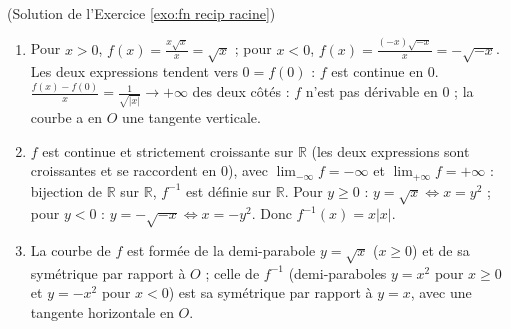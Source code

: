 \begin{corrige}
\begin{sol} ~ \\
(Solution de l'Exercice \ref{exo:fn recip racine})
\begin{enumerate}
\item Pour $x > 0$, $f(x) = \frac{x\sqrt{x}}{x} = \sqrt{x}$ ; pour $x < 0$, $f(x) = \frac{(-x)\sqrt{-x}}{x} = -\sqrt{-x}$.
      Les deux expressions tendent vers $0 = f(0)$ : $f$ est continue en $0$.
      $\frac{f(x) - f(0)}{x} = \frac{1}{\sqrt{|x|}} \to +\infty$ des deux c\^ot\'es : $f$ n'est pas d\'erivable en $0$ ; la courbe a en $O$ une tangente verticale.
\item $f$ est continue et strictement croissante sur $\mathbb{R}$ (les deux expressions sont croissantes et se raccordent en $0$), avec
      $\lim_{-\infty} f = -\infty$ et $\lim_{+\infty} f = +\infty$ : bijection de $\mathbb{R}$ sur $\mathbb{R}$, $f^{-1}$ est d\'efinie sur $\mathbb{R}$.
      Pour $y \geq 0$ : $y = \sqrt{x} \iff x = y^2$ ; pour $y < 0$ : $y = -\sqrt{-x} \iff x = -y^2$. Donc $\boxed{f^{-1}(x) = x|x|}$.
\item La courbe de $f$ est form\'ee de la demi-parabole $y = \sqrt{x}$ ($x \geq 0$) et de sa sym\'etrique par rapport \`a $O$ ; celle de $f^{-1}$
      (demi-paraboles $y = x^2$ pour $x \geq 0$ et $y = -x^2$ pour $x < 0$) est sa sym\'etrique par rapport \`a $y = x$, avec une tangente horizontale en $O$.
\end{enumerate}
\end{sol}


\end{corrige}
